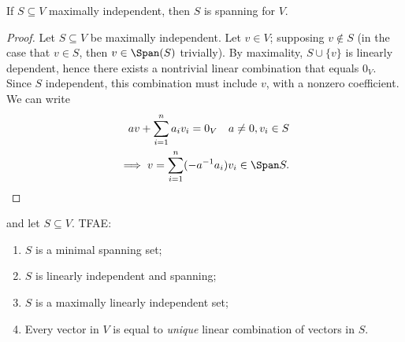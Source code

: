 \begin{lemma}\label{lemma:maximallyisspanning}
    If $S \subseteq V$ maximally independent, then $S$ is spanning for $V$.
\end{lemma}

\begin{proof}
    Let $S \subseteq V$ be maximally independent. Let $v \in V$; supposing $v \notin S$ (in the case that $v \in S$, then $v \in \Span (S)$ trivially). By maximality, $S \cup \{v\}$ is linearly dependent, hence there exists a nontrivial linear combination that equals $0_V$. Since $S$ independent, this combination must include $v$, with a nonzero coefficient. We can write \begin{align*}
        a v + \sum_{i=1}^{n} a_i v_i = 0_V \quad a \neq 0, v_i \in S\\
        \implies v = \sum_{i=1}^{n} (-a^{-1}a_i)v_i \in \Span S.
    \end{align*}
\end{proof}

\begin{theorem}
     and let $S \subseteq V$. TFAE: \begin{enumerate}
        \item $S$ is a minimal spanning set;
        \item $S$ is linearly independent and spanning;
        \item $S$ is a maximally linearly independent set;
        \item Every vector in $V$ is equal to \emph{unique} linear combination of vectors in $S$.
    \end{enumerate}
\end{theorem}